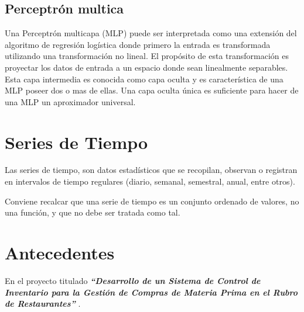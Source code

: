 \subsection{Perceptrón multica}
Una Perceptrón multicapa (MLP) puede ser interpretada como una extensión del algoritmo de regresión logística donde primero la entrada es transformada utilizando una transformación no lineal\cite{de2014aprendizaje}. El propósito de esta transformación es proyectar los datos de entrada a un espacio donde sean linealmente separables.
Esta capa intermedia es conocida como capa oculta y es característica de una MLP poseer dos o mas de ellas. Una capa oculta única es suficiente para hacer de una MLP un aproximador universal.

\section{Series de Tiempo}
Las series de tiempo, son datos estadísticos que se recopilan, observan o registran en intervalos de tiempo regulares (diario, semanal, semestral, anual, entre otros)\cite{herrera2020prediccion}. 

Conviene recalcar que una serie de tiempo es un conjunto ordenado de valores, no una función, y que no debe ser tratada como tal\cite{nava2015procesamiento}.




\section{Antecedentes}
En el proyecto titulado \textbf{\textit{“Desarrollo de un Sistema de Control de Inventario para la Gestión de Compras de Materia Prima en el Rubro de Restaurantes”}} \cite{condorena2017desarrollo}. 

